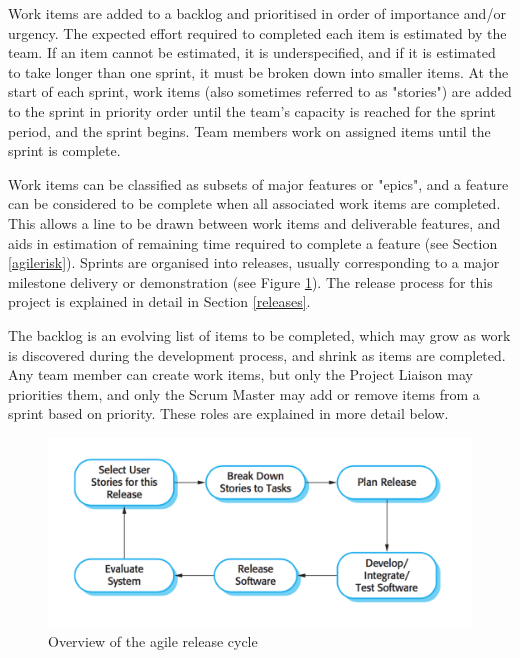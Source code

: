 \documentclass[12pt]{article}
\begin{document}
Work items are added to a backlog and prioritised in order of importance and/or urgency. The expected effort required to completed each item is estimated by the team. If an item cannot be estimated, it is underspecified, and if it is estimated to take longer than one sprint, it must be broken down into smaller items.
At the start of each sprint, work items (also sometimes referred to as "stories") are added to the sprint in priority order until the team's capacity is reached for the sprint period, and the sprint begins. Team members work on assigned items until the sprint is complete.

Work items can be classified as subsets of major features or "epics", and a feature can be considered to be complete when all associated work items are completed. This allows a line to be drawn between work items and deliverable features, and aids in estimation of remaining time required to complete a feature (see Section \ref{agilerisk}). Sprints are organised into releases, usually corresponding to a major milestone delivery or demonstration (see Figure \ref{fig:agile}). The release process for this project is explained in detail in Section \ref{releases}.

The backlog is an evolving list of items to be completed, which may grow as work is discovered during the development process, and shrink as items are completed. Any team member can create work items, but only the Project Liaison may priorities them, and only the Scrum Master may add or remove items from a sprint based on priority. These roles are explained in more detail below.

\begin{figure}[h!]
\includegraphics[width=\textwidth]{The_extreme_programming_release_cycle.png}
\caption{Overview of the agile release cycle \cite{sommerville}}
  \label{fig:agile}
\end{figure}
\end{document}
